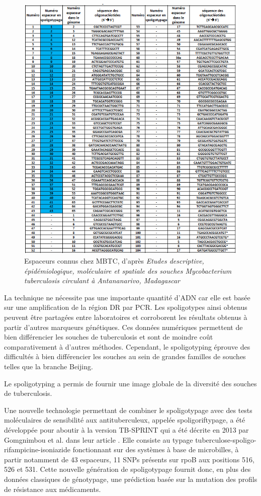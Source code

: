 \documentclass[twoside,a4paper,11pt,frenchb,openany]{report}
\begin{document}
\begin{figure}[h!]
\centering
\includegraphics[scale=0.7]{spacer.png}
\caption{Espaceurs connus chez MBTC, d'après \textit{Etudes descriptive, épidémiologique, moléculaire et spatiale des souches Mycobacterium tuberculosis circulant à Antananarivo, Madagascar}}
\end{figure}

La technique ne nécessite pas une importante quantité d'ADN car elle est basée sur une amplification de la région DR par PCR.
Les spoligotypes ainsi obtenus peuvent être partagées entre laboratoires et corroborent les résultats obtenus à partir d'autres marqueurs génétiques. Ces données numériques permettent de bien différencier les souches de tuberculosis et sont de moindre coût comparativement à d'autres méthodes. Cependant, le spoligotyping éprouve des difficultés à bien différencier les souches au sein de grandes familles de souches telles que la branche Beijing.

Le spoligotyping a permis de fournir une image globale de la diversité des souches de tuberculosis.

Une nouvelle technologie permettant de combiner le spoligotypage avec des tests moléculaires de sensibilité aux antituberculeux, appelée spoligoriftypage, a été développée pour aboutir à la version TB-SPRINT qui a été décrite en 2013 par Gomgnimbou et al. dans leur article \cite{gomgnimbou}. Elle consiste au typage tuberculose-spoligo-rifampicine-isoniazide fonctionnant sur des systèmes à base de microbilles, à partir notamment de 43 espaceurs, 11 SNPs présents sur rpoB aux positions 516, 526 et 531. Cette nouvelle génération de spoligotypage fournit donc, en plus des données classiques de génotypage, une prédiction basée sur la mutation des profils de résistance aux médicaments.
\end{document}
